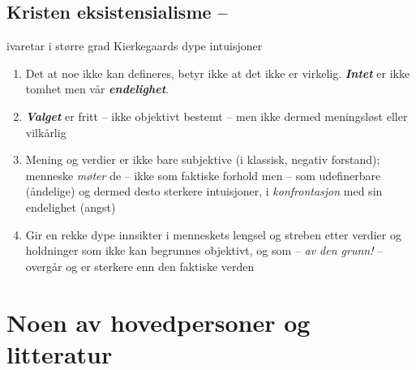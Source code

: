 \documentclass[12pt]{article}
\newcommand{\co}[1]{{\bf\em #1\/}}
\newcommand{\citt}[1]{{\em #1}}
\begin{document}
\subsection{Kristen eksistensialisme --}
 ivaretar i st{\o}rre grad Kierkegaards dype intuisjoner
\begin{enumerate}
\item Det at noe ikke kan defineres, betyr ikke at det ikke er
virkelig. \co{Intet} er ikke tomhet men v{\aa}r \co{endelighet}.
\item \co{Valget} er fritt -- ikke objektivt bestemt -- men ikke dermed meningsl{\o}st eller vilk{\aa}rlig
\item Mening og verdier er ikke bare subjektive (i klassisk, negativ
forstand); menneske {\em m{\o}ter} de -- ikke som faktiske forhold men -- som
udefinerbare ({\aa}ndelige) og dermed desto sterkere intuisjoner, i {\em konfrontasjon} med 
sin endelighet (angst)
\item
Gir en rekke dype innsikter i menneskets
lengsel og streben etter verdier og holdninger som ikke kan begrunnes
objektivt, og som -- {\em av den grunn!} -- overg{\aa}r og er sterkere enn den
faktiske verden
\end{enumerate}

\newpage
\section{Noen av hovedpersoner og  litteratur}
\end{document}
